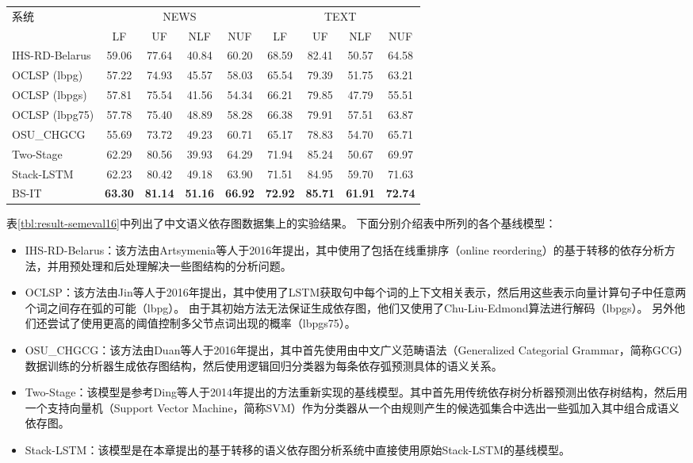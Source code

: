 \begin{table}[htpb]
    \vspace{0.5em}\centering\wuhao
	\begin{tabular}{lcccccccc}
		\toprule[1.5pt]
		\multirow{2}{*}{ 系统}&\multicolumn{4}{c}{NEWS}&\multicolumn{4}{c}{TEXT}\\
		\cmidrule(r){2-5} \cmidrule(r){6-9}
		& LF& UF& NLF& NUF& LF& UF& NLF& NUF\\
		\midrule[1pt]
		IHS-RD-Belarus&59.06&77.64&40.84&60.20&68.59&82.41&50.57&64.58\\
		OCLSP (lbpg)&57.22&74.93&45.57&58.03&65.54&79.39&51.75&63.21\\
		OCLSP (lbpgs)&57.81&75.54&41.56&54.34&66.21&79.85&47.79&55.51\\
		OCLSP (lbpg75)&57.78&75.40&48.89&58.28&66.38&79.91&57.51&63.87\\
		OSU\_CHGCG&55.69&73.72&49.23&60.71&65.17&78.83&54.70&65.71\\
		Two-Stage & 62.29&80.56&39.93&64.29&71.94&85.24&50.67&69.97 \\ 
		Stack-LSTM &62.23&80.42&49.18&63.90&71.51&84.95&59.70&71.63\\
		BS-IT &\bf63.30&\bf81.14&\bf51.16&\bf66.92&\bf72.92&\bf85.71&\bf61.91&\bf72.74\\
		\bottomrule[1.5pt]
	\end{tabular}
\end{table}

表\ref{tbl:result-semeval16}中列出了中文语义依存图数据集上的实验结果。
下面分别介绍表中所列的各个基线模型：
\begin{itemize}
    \item IHS-RD-Belarus\cite{artsymenia-etal-2016-ihs}：该方法由Artsymenia等人于2016年提出，其中使用了包括在线重排序（online reordering）的基于转移的依存分析方法，并用预处理和后处理解决一些图结构的分析问题。
    \item OCLSP\cite{jin-etal-2016-oclsp}：该方法由Jin等人于2016年提出，其中使用了LSTM获取句中每个词的上下文相关表示，然后用这些表示向量计算句子中任意两个词之间存在弧的可能（lbpg）。
    由于其初始方法无法保证生成依存图，他们又使用了Chu-Liu-Edmond算法\cite{chu-liu-1965-shortest}进行解码（lbpgs）。
    另外他们还尝试了使用更高的阈值控制多父节点词出现的概率（lbpgs75）。
    
    \item OSU\_CHGCG\cite{duan-etal-2016-osu}：该方法由Duan等人于2016年提出，其中首先使用由中文广义范畴语法（Generalized Categorial Grammar，简称GCG）数据训练的分析器生成依存图结构，然后使用逻辑回归分类器为每条依存弧预测具体的语义关系。
    \item Two-Stage：该模型是参考Ding等人\cite{ding-etal-2014-dependency}于2014年提出的方法重新实现的基线模型。其中首先用传统依存树分析器预测出依存树结构，然后用一个支持向量机（Support Vector Machine，简称SVM）作为分类器从一个由规则产生的候选弧集合中选出一些弧加入其中组合成语义依存图。
    \item Stack-LSTM：该模型是在本章提出的基于转移的语义依存图分析系统中直接使用原始Stack-LSTM的基线模型。
\end{itemize}

